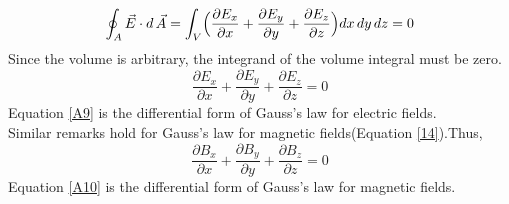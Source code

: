 \documentclass[12pt]{article}
\numberwithin{equation}{section}
\begin{document}
\[
    \oint_A \vec{E}\cdot d\,\vec{A}=\int_V \Bigl(\frac{\partial{E_x}}{\partial{x}}+\frac{\partial{E_y}}{\partial{y}}+\frac{\partial{E_z}}{\partial{z}}\Bigl)dx\,dy\,dz=0
\]
Since the volume is arbitrary, the integrand of the volume integral must be zero.
\begin{equation}
    \frac{\partial{E_x}}{\partial{x}}+\frac{\partial{E_y}}{\partial{y}}+\frac{\partial{E_z}}{\partial{z}}=0\label{A9}
\end{equation}
Equation \eqref{A9} is the differential form of Gauss's law for electric fields.\\
\indent Similar remarks hold for Gauss's law for magnetic fields(Equation \eqref{14}).Thus,
\begin{equation}
    \frac{\partial{B_x}}{\partial{x}}+\frac{\partial{B_y}}{\partial{y}}+\frac{\partial{B_z}}{\partial{z}}=0\label{A10}
\end{equation}
Equation \eqref{A10} is the differential form of Gauss's law for magnetic fields.
\newpage
\end{document}

